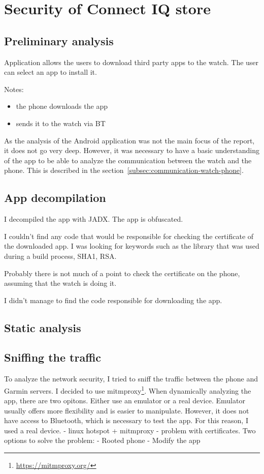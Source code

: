 \section{Security of Connect IQ store}
\subsection{Preliminary analysis}
Application allows the users to download third party apps to the watch.
The user can select an app to install it.

Notes:
\begin{itemize}
    \item the phone downloads the app
    \item sends it to the watch via BT
\end{itemize}

As the analysis of the Android application was not the main focus of the report, it does not go very deep.
However, it was necessary to have a basic understanding of the app to be able to analyze the communication between the watch and the phone.
This is described in the section~\ref{subsec:communication-watch-phone}.

\subsection{App decompilation}
I decompiled the app with JADX. The app is obfuscated.

I couldn't find any code that would be responsible for checking the certificate of the downloaded app.
I was looking for keywords such as the library that was used during a build process, SHA1, RSA\@.

Probably there is not much of a point to check the certificate on the phone, assuming that the watch is doing it.

I didn't manage to find the code responsible for downloading the app.
\subsection{Static analysis}

\subsection{Sniffing the traffic}
To analyze the network security, I tried to sniff the traffic between the phone and Garmin servers.
I decided to use mitmproxy\footnote{\url{https://mitmproxy.org/}}.
When dynamically analyzing the app, there are two opitons.
Either use an emulator or a real device.
Emulator usually offers more flexibility and is easier to manipulate.
However, it does not have access to Bluetooth, which is necessary to test the app.
For this reason, I used a real device.
- linux hotspot + mitmproxy - problem with certificates.
Two options to solve the problem:
- Rooted phone
- Modify the app

